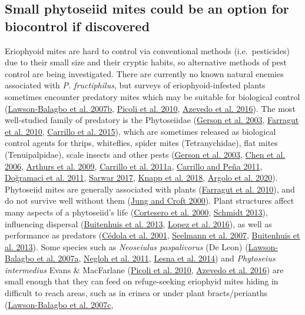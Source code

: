 \documentclass{ufdissertation}[overrideChapters] %
\begin{document}
{{\subsection{Small phytoseiid mites could be an option for biocontrol if discovered}\label{small-phytoseiid-mites-could-be-an-option-for-biocontrol-if-discovered}}

Eriophyoid mites are hard to control via conventional methods (i.e.~pesticides) due to their small size and their cryptic habits, so alternative methods of pest control are being investigated. There are currently no known natural enemies associated with \emph{P. fructiphilus}, but surveys of eriophyoid-infested plants sometimes encounter predatory mites which may be suitable for biological control (\protect\hyperlink{ref-LawsonBalagbo2007b}{Lawson-Balagbo et al. 2007b}, \protect\hyperlink{ref-Picoli2010}{Picoli et al. 2010}, \protect\hyperlink{ref-Azevedo2016}{Azevedo et al. 2016}). The most well-studied family of predatory is the Phytoseiidae (\protect\hyperlink{ref-Gerson2003}{Gerson et al. 2003}, \protect\hyperlink{ref-Farragut2010}{Farragut et al. 2010}, \protect\hyperlink{ref-Carrillo2015}{Carrillo et al. 2015}), which are sometimes released as biological control agents for thrips, whiteflies, spider mites (Tetranychidae), flat mites (Tenuipalpidae), scale insects and other pests (\protect\hyperlink{ref-Gerson2003}{Gerson et al. 2003}, \protect\hyperlink{ref-Chen2006}{Chen et al. 2006}, \protect\hyperlink{ref-Arthurs2009}{Arthurs et al. 2009}, \protect\hyperlink{ref-Carrillo2011a}{Carrillo et al. 2011a}, \protect\hyperlink{ref-Carrillo2011}{Carrillo and Peña 2011}, \protect\hyperlink{ref-Dogramaci2011}{Doğramaci et al. 2011}, \protect\hyperlink{ref-Sarwar2017}{Sarwar 2017}, \protect\hyperlink{ref-Knapp2018}{Knapp et al. 2018}, \protect\hyperlink{ref-Argolo2020}{Argolo et al. 2020}). Phytoseiid mites are generally associated with plants (\protect\hyperlink{ref-Farragut2010}{Farragut et al. 2010}), and do not survive well without them (\protect\hyperlink{ref-Jung2000}{Jung and Croft 2000}). Plant structures affect many aspects of a phytoseiid's life (\protect\hyperlink{ref-Cortesero2000}{Cortesero et al. 2000}, \protect\hyperlink{ref-Schmidt2013}{Schmidt 2013}), influencing dispersal (\protect\hyperlink{ref-Buitenhuis2013}{Buitenhuis et al. 2013}, \protect\hyperlink{ref-Lopez2016}{Lopez et al. 2016}), as well as performance as predators (\protect\hyperlink{ref-Cedola2001}{Cédola et al. 2001}, \protect\hyperlink{ref-Seelmann2007}{Seelmann et al. 2007}, \protect\hyperlink{ref-Buitenhuis2013}{Buitenhuis et al. 2013}). Some species such as \emph{Neoseiulus paspalivorus} (De Leon) (\protect\hyperlink{ref-LawsonBalagbo2007}{Lawson-Balagbo et al. 2007a}, \protect\hyperlink{ref-Negloh2011}{Negloh et al. 2011}, \protect\hyperlink{ref-Lesna2014}{Lesna et al. 2014}) and \emph{Phytoseius intermedius} Evans \& MacFarlane (\protect\hyperlink{ref-Picoli2010}{Picoli et al. 2010}, \protect\hyperlink{ref-Azevedo2016}{Azevedo et al. 2016}) are small enough that they can feed on refuge-seeking eriophyid mites hiding in difficult to reach areas, such as in erinea or under plant bracts/perianths (\protect\hyperlink{ref-LawsonBalagbo2007a}{Lawson-Balagbo et al. 2007c}, }
\end{document}
